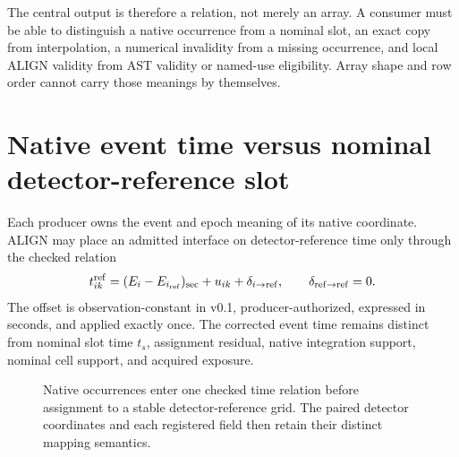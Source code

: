 \documentclass[10pt]{article}
\begin{document}
The central output is therefore a relation, not merely an array.  A consumer
must be able to distinguish a native occurrence from a nominal slot, an exact
copy from interpolation, a numerical invalidity from a missing occurrence,
and local ALIGN validity from AST validity or named-use eligibility.  Array
shape and row order cannot carry those meanings by themselves.

\section{Native event time versus nominal detector-reference slot}

Each producer owns the event and epoch meaning of its native coordinate.
ALIGN may place an admitted interface on detector-reference time only through
the checked relation
\[
 t^{\rm ref}_{ik}=(E_i-E_{i_{\rm ref}})_{\rm sec}+u_{ik}
 +\delta_{i\rightarrow\rm ref},\qquad
 \delta_{{\rm ref}\rightarrow{\rm ref}}=0.
\]
The offset is observation-constant in v0.1, producer-authorized, expressed in
seconds, and applied exactly once.  The corrected event time remains distinct
from nominal slot time \(t_s\), assignment residual, native integration
support, nominal cell support, and acquired exposure.

\begin{figure}[b]
\centering
{}
\caption{Native occurrences enter one checked time relation before assignment
to a stable detector-reference grid.  The paired detector coordinates and
each registered field then retain their distinct mapping semantics.}
\label{fig:one-grid}
\end{figure}
\end{document}
